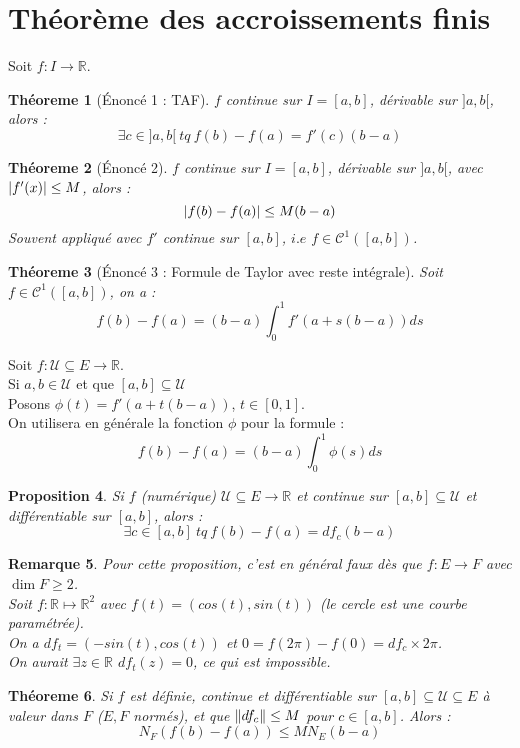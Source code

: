 \documentclass[a4paper, oneside]{report}
\theoremstyle{break}
\newtheorem{thm}{Théoreme}[section] %
\newtheorem{propo}[thm]{Proposition}
\newtheorem{remar}[thm]{Remarque}
\newcommand{\x}{\times}
\newcommand{\R}{\mathbb{R}}
\newcommand{\U}{\mathcal{U}}
\DeclarePairedDelimiter\abs{\lvert}{\rvert}%
\DeclarePairedDelimiter\norm{\lVert}{\rVert}%
\begin{document}
\section{Théorème des accroissements finis}
Soit $f: I\rightarrow \R$.

\begin{thm}[Énoncé 1 : TAF]
$f$ continue sur $I=[a,b]$, dérivable sur $]a,b[$, alors :
$$\exists c \in ]a,b[~tq~f(b)-f(a)=f'(c)(b-a)$$
\end{thm}

\begin{thm}[Énoncé 2]
$f$ continue sur $I=[a,b]$, dérivable sur $]a,b[$, avec $\abs{f'(x)}\leq M$, alors :
$$\abs{f(b)-f(a)}\leq M (b-a)$$
Souvent appliqué avec $f'$ continue sur $[a,b]$, $i.e$ $f\in  \mathcal{C}^1([a,b])$.
\end{thm}

\begin{thm}[Énoncé 3 : Formule de Taylor avec reste intégrale]
Soit $f\in \mathcal{C}^1([a,b])$, on a :
$$f(b)-f(a)=(b-a)\int_0^1f'(a+s(b-a))ds$$
\end{thm}

\noindent Soit $f:\U \subseteq E \rightarrow \R$.\\
Si $a,b\in \U$ et que $[a,b]\subseteq \U$\\
Posons $\phi(t)=f'(a+t(b-a))$, $t\in [0,1]$.\\
On utilisera en générale la fonction $\phi$ pour la formule :
$$f(b)-f(a)=(b-a)\int_0^1\phi(s)ds$$

\begin{propo}
Si $f$ (numérique) $\U\subseteq E \rightarrow \R$ et continue sur $[a,b]\subseteq \U$ et différentiable sur $[a,b]$, alors :
$$\exists c \in [a,b]~tq~f(b)-f(a)=d f_c(b-a)$$
\end{propo}

\begin{remar}
Pour cette proposition, c'est en général faux dès que $f:E\rightarrow F$ avec $\dim F \geq 2$.\\
Soit $f:\R \mapsto \R^2$ avec $f(t)=(cos(t), sin(t))$ (le cercle est une courbe paramétrée).\\
On a $df_t = (-sin(t), cos(t))$ et $0 = f(2\pi) - f(0)=df_c \x 2\pi$.\\
On aurait $\exists z \in \R$ $df_t(z) = 0$, ce qui est impossible.
\end{remar}

\begin{thm}
Si $f$ est définie, continue et différentiable sur $[a,b]\subseteq \U \subseteq E$ à valeur dans $F$ ($E,F$ normés), et que $\norm{df_c}\leq M$ pour $c\in [a,b]$. Alors :
$$N_F(f(b)-f(a))\leq M N_E(b-a)$$
\end{thm}
\end{document}
